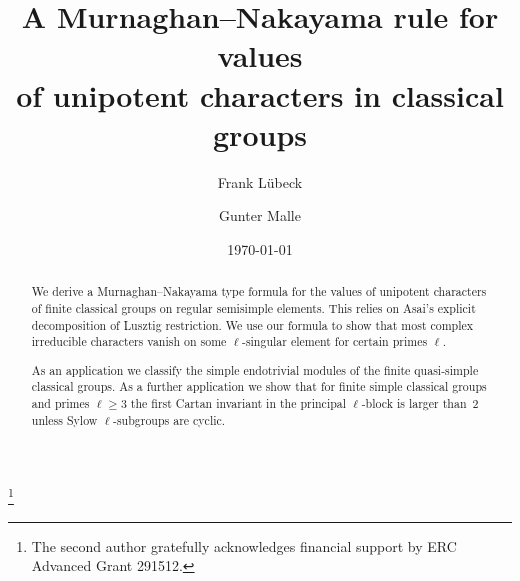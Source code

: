 \documentclass{ert-l}
\theoremstyle{definition}
\theoremstyle{remark}
\begin{document}
\title[Murnaghan--Nakayama rule for unipotent characters]
      {A Murnaghan--Nakayama rule for values\\ of unipotent characters in
       classical groups}

\date{\today}


\author{Frank L\"ubeck}
\address{Lehrstuhl D f\"ur Mathematik, RWTH Aachen, Pontdriesch 14/16,
  52062 Aachen, Germany.}

\author{Gunter Malle }
\address{FB Mathematik, TU Kaiserslautern, Postfach 3049,
         67653 Kaisers\-lautern, Germany.}

\thanks{The second author gratefully acknowledges financial support by ERC
  Advanced Grant 291512.}




\begin{abstract}
We derive a Murnaghan--Nakayama type formula for the values of unipotent
characters of finite classical groups on regular semisimple elements. This
relies on Asai's explicit decomposition of Lusztig restriction. We use our
formula to show that most complex irreducible characters vanish on some
$\ell$-singular element for certain primes $\ell$.

As an application we classify the simple endotrivial modules of the finite
quasi-simple classical groups. As a further application we show that for
finite simple classical groups and primes $\ell\ge3$ the first Cartan invariant
in the principal $\ell$-block is larger than~2 unless Sylow $\ell$-subgroups
are cyclic.
\end{abstract}

\maketitle


\end{document}
